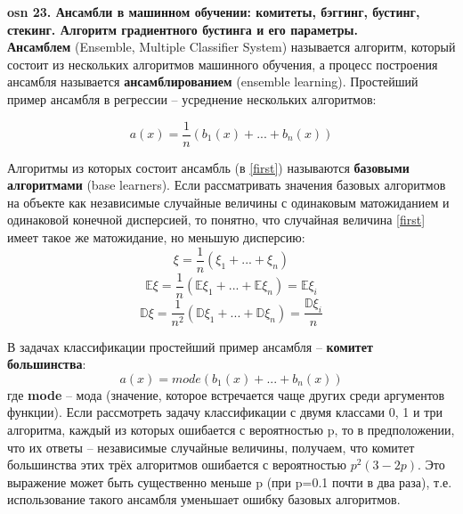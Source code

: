 

\textbf{\LARGE osn 23. Ансамбли в машинном обучении: комитеты, бэггинг, бустинг, стекинг. Алгоритм градиентного бустинга и его параметры.}  \\
\textbf{Ансамблем} (Ensemble, Multiple Classifier System) называется алгоритм, который состоит из нескольких алгоритмов машинного обучения, а процесс построения ансамбля называется \textbf {ансамблированием} (ensemble learning). Простейший пример ансамбля в регрессии – усреднение нескольких алгоритмов:

\begin{equation}\label{first}
a(x) = \frac{1}{n}(b_1(x)+...+b_n(x))
\end{equation}

Алгоритмы из которых состоит ансамбль (в \ref{first}) называются \textbf{базовыми алгоритмами} (base learners). Если рассматривать значения базовых алгоритмов на объекте  как независимые случайные величины с одинаковым матожиданием  и одинаковой конечной дисперсией, то понятно, что случайная величина \ref{first} имеет такое же матожидание, но меньшую дисперсию:
\begin{equation}
    \xi = \frac{1}{n}(\xi_1+...+\xi_n) 
\end{equation}
\begin{equation}
    \mathbb{E}\xi=\frac{1}{n}(\mathbb{E}\xi_1+...+\mathbb{E}\xi_n)=\mathbb{E}\xi_i
\end{equation}
\begin{equation}
    \mathbb{D}\xi=\frac{1}{n^2}(\mathbb{D}\xi_1+...+\mathbb{D}\xi_n)=\frac{\mathbb{D}\xi_i}{n}
\end{equation}

В задачах классификации простейший пример ансамбля – \textbf{комитет большинства}:
\begin{equation}\label{komitet}
a(x) = mode(b_1(x)+...+b_n(x))
\end{equation}
где  \textbf{mode} – мода (значение, которое встречается чаще других среди аргументов функции). Если рассмотреть задачу классификации с двумя классами {0, 1}  и три алгоритма, каждый из которых ошибается  с вероятностью p, то в предположении, что их ответы – независимые случайные величины, получаем, что комитет большинства этих трёх алгоритмов ошибается с вероятностью $p^2(3-2p)$. Это выражение может быть существенно меньше p  (при p=0.1  почти в два раза), т.е. использование такого ансамбля уменьшает ошибку базовых алгоритмов.

